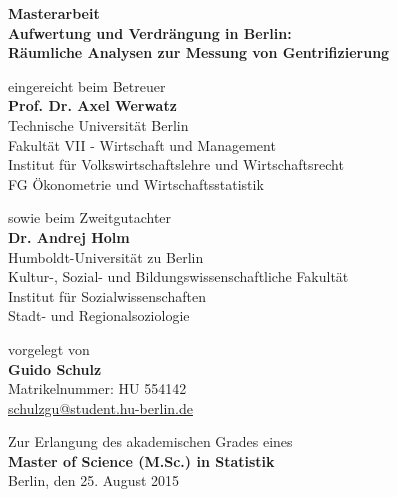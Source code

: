 \begin{center}
    {\normalsize{\bf Masterarbeit}} \\\vspace{0.5cm}
    {\Large{\bf Aufwertung und Verdrängung in Berlin: \\
                Räumliche Analysen zur Messung von Gentrifizierung}} \vspace{1.0cm}

    {\normalsize eingereicht beim Betreuer}\\\vspace{0.5cm}
    {\normalsize{\bf Prof. Dr. Axel Werwatz}} \\\vspace{0.5cm}
    {\normalsize Technische Universität Berlin \\
    Fakultät VII - Wirtschaft und Management \\
    Institut für Volkswirtschaftslehre und Wirtschaftsrecht \\
    FG Ökonometrie und Wirtschaftsstatistik} \vspace{1cm}

    {\normalsize sowie beim Zweitgutachter}\\\vspace{0.5cm}
    {\normalsize{\bf Dr. Andrej Holm}} \\\vspace{0.5cm}
    {\normalsize Humboldt-Universität zu Berlin \\
    Kultur-, Sozial- und Bildungswissenschaftliche Fakultät\\
    Institut für Sozialwissenschaften\\
    Stadt- und Regionalsoziologie} \vspace{1cm}

    {\normalsize vorgelegt von \\\vspace{0.5cm}
    {\bf Guido Schulz} \\
    Matrikelnummer: HU 554142 \\
    \href{mailto:schulzgu@student.hu-berlin.de}{schulzgu@student.hu-berlin.de}} \vspace{1cm}


    {\normalsize Zur Erlangung des akademischen Grades eines \\
    {\bf Master of Science (M.Sc.) in Statistik} \\
    Berlin, den 25. August 2015}

\end{center}
